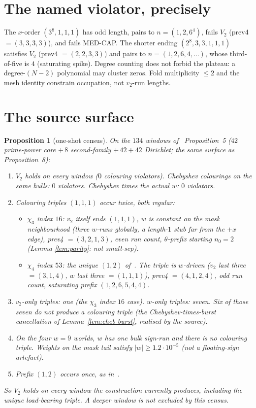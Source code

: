 \documentclass[11pt]{article}
\newtheorem{prop}{Proposition}
\theoremstyle{remark}
\begin{document}
\section{The named violator, precisely}\label{sec:viol}

The $x$-order $(3^8,1,1,1)$ has odd length, pairs to
$n=(1,2,6^4)$, fails $V_2$ (prev4 $=(3,3,3,3)$), and fails
MED-CAP.  The shorter ending $(2^8,3,3,1,1,1)$ satisfies $V_2$
(prev4 $=(2,2,3,3)$) and pairs to $n=(1,2,6,4,\ldots)$, whose
third-of-five is $4$ (saturating spike).  Degree counting does
not forbid the plateau: a degree-$(N-2)$ polynomial may cluster
zeros.  Fold multiplicity $\le 2$ and the mesh identity constrain
occupation, not $v_2$-run lengths.

\section{The source surface}\label{sec:census}

\begin{prop}[one-shot census]\label{prop:census}
On the $134$ windows of~\cite{medcap} Proposition~5
($42$ prime-power core $+\,8$ second-family $+\,42+42$ Dirichlet;
the same surface as~\cite{xn} Proposition~8):
\begin{enumerate}
\item $V_2$ holds on every window ($0$ colouring violators).
  Chebyshev colourings on the same hulls: $0$ violators.
  Chebyshev times the actual $w$: $0$ violators.
\item Colouring triples $(1,1,1)$ occur twice, both regular:
  \begin{itemize}
  \item $\chi_3$ index $16$: $v_2$ itself ends $(1,1,1)$, $w$ is
    constant on the mask neighbourhood (three $w$-runs globally,
    a length-$1$ stub far from the $+x$ edge), prev4 $=(3,2,1,3)$,
    even run count, $\theta$-prefix starting $n_0=2$ (Lemma
    \ref{lem:parity}: not small-sep).
  \item $\chi_4$ index $53$: the unique $(1,2)$ of~\cite{xn}.
    The triple is $w$-driven ($v_2$ last three $=(3,1,4)$, $w$
    last three $=(1,1,1)$), prev4 $=(4,1,2,4)$, odd run count,
    saturating prefix $(1,2,6,5,4,4)$.
  \end{itemize}
\item $v_2$-only triples: one (the $\chi_3$ index $16$ case).
  $w$-only triples: seven.  Six of those seven do not produce a
  colouring triple (the Chebyshev-times-burst cancellation of
  Lemma~\ref{lem:cheb-burst}, realised by the source).
\item On the four $w=9$ worlds, $w$ has one bulk sign-run and
  there is no colouring triple.  Weights on the mask tail satisfy
  $|w|\ge 1.2\cdot 10^{-5}$ (not a floating-sign artefact).
\item Prefix $(1,2)$ occurs once, as in~\cite{xn}.
\end{enumerate}
So $V_2$ holds on every window the construction currently
produces, including the unique load-bearing triple.  A deeper
window is not excluded by this census.
\end{prop}
\end{document}
